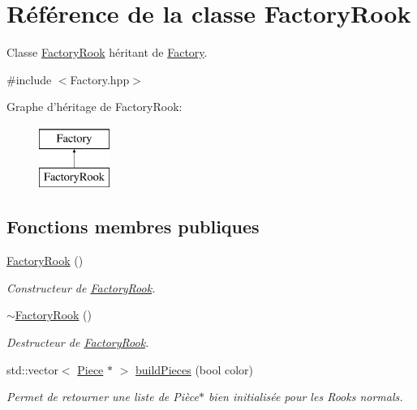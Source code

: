 \hypertarget{class_factory_rook}{\section{Référence de la classe Factory\-Rook}
\label{class_factory_rook}
}


Classe \hyperlink{class_factory_rook}{Factory\-Rook} héritant de \hyperlink{class_factory}{Factory}.  




{\ttfamily \#include $<$Factory.\-hpp$>$}

Graphe d'héritage de Factory\-Rook\-:\begin{figure}[H]
\begin{center}
\leavevmode
\includegraphics[height=2.000000cm]{class_factory_rook}
\end{center}
\end{figure}
\subsection*{Fonctions membres publiques}
\begin{DoxyCompactItemize}
\item 
\hyperlink{class_factory_rook_a4d8dfebcba093ee2f6009ffe907a8a8a}{Factory\-Rook} ()
\begin{DoxyCompactList}\small\item\em Constructeur de \hyperlink{class_factory_rook}{Factory\-Rook}. \end{DoxyCompactList}\item 
\hyperlink{class_factory_rook_a0bc1c85e0c4db96d877ccf00566470f4}{$\sim$\-Factory\-Rook} ()
\begin{DoxyCompactList}\small\item\em Destructeur de \hyperlink{class_factory_rook}{Factory\-Rook}. \end{DoxyCompactList}\item 
std\-::vector$<$ \hyperlink{class_piece}{Piece} $\ast$ $>$ \hyperlink{class_factory_rook_a50ff41cf552af801c123bf2b28120c68}{build\-Pieces} (bool color)
\begin{DoxyCompactList}\small\item\em Permet de retourner une liste de Pièce$\ast$ bien initialisée pour les Rooks normals. \end{DoxyCompactList}\end{DoxyCompactItemize}


